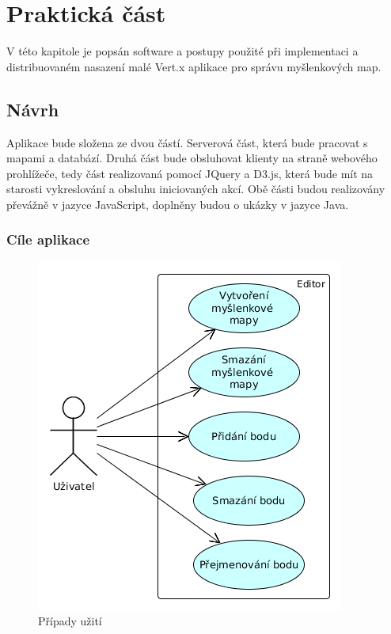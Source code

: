 
\chapter{Praktická část}

V této kapitole je popsán software a postupy použité při implementaci a distribuovaném nasazení malé Vert.x aplikace pro správu myšlenkových map.

\section{Návrh}

Aplikace bude složena ze dvou částí. Serverová část, která bude pracovat s mapami a databází. Druhá část bude obsluhovat klienty na straně webového prohlížeče, tedy část realizovaná pomocí JQuery a D3.js, která bude mít na starosti vykreslování a obsluhu iniciovaných akcí.	Obě části budou realizovány převážně v jazyce JavaScript, doplněny budou o ukázky v jazyce Java.

\subsection{Cíle aplikace}\label{sub:use_case}

\begin{figure}[h]
\begin{centering}
\includegraphics[scale=0.5]{obrazky/use_case}
\par\end{centering}
\caption{Případy užití\label{fig:use_case}}
\end{figure}

